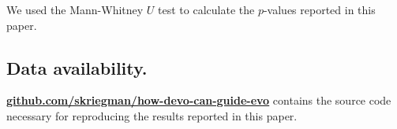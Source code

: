 We used the Mann-Whitney $U$ test to calculate the $p$-values reported in this paper.


\subsection*{Data availability.}

\href{https://github.com/skriegman/how-devo-can-guide-evo}{\color{blue}\textbf{github.com/skriegman/how-devo-can-guide-evo}} contains the source code necessary for reproducing the results reported in this paper.





